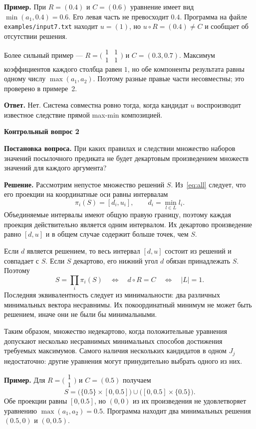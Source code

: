 \documentclass[14pt,a4paper]{extarticle}
\newcommand{\reportheading}[1]{\par\vspace{0.8\baselineskip}\noindent\textbf{#1}\par\nobreak\vspace{0.35\baselineskip}\nobreak}
\begin{document}
\textbf{Пример.} При $R=(0.4)$ и $C=(0.6)$ уравнение имеет вид $\min(a_1,0.4)=0.6$. Его левая часть не превосходит $0.4$. Программа на файле \texttt{examples/input7.txt} находит $u=(1)$, но $u\circ R=(0.4)\ne C$ и сообщает об отсутствии решения.

Более сильный пример --- $R=\bigl(\begin{smallmatrix}1&1\\1&1\end{smallmatrix}\bigr)$ и $C=(0.3,0.7)$. Максимум коэффициентов каждого столбца равен $1$, но обе компоненты результата равны одному числу $\max(a_1,a_2)$. Поэтому разные правые части несовместны; это проверено в примере~2.

\textbf{Ответ.} Нет. Система совместна ровно тогда, когда кандидат $u$ воспроизводит известное следствие прямой max-min композицией.

\clearpage
\reportheading{Контрольный вопрос 2}
\noindent\textbf{Постановка вопроса.} При каких правилах и следствии множество наборов значений посылочного предиката не будет декартовым произведением множеств значений для каждого аргумента?

\textbf{Решение.} Рассмотрим непустое множество решений $S$. Из~\eqref{eq:all} следует, что его проекции на координатные оси равны интервалам
\[
 \pi_i(S)=[d_i,u_i],\qquad d_i=\min_{l\in L}l_i.
\]
Объединяемые интервалы имеют общую правую границу, поэтому каждая проекция действительно является одним интервалом. Их декартово произведение равно $[d,u]$ и в общем случае содержит больше точек, чем $S$.

Если $d$ является решением, то весь интервал $[d,u]$ состоит из решений и совпадает с $S$. Если $S$ декартово, его нижний угол $d$ обязан принадлежать $S$. Поэтому
\begin{equation}
 S=\prod_i\pi_i(S)
 \quad\Longleftrightarrow\quad d\circ R=C
 \quad\Longleftrightarrow\quad |L|=1.
 \label{eq:cartesian}
\end{equation}
Последняя эквивалентность следует из минимальности: два различных минимальных вектора несравнимы. Их покоординатный минимум не может быть решением, иначе они не были бы минимальными.

Таким образом, множество недекартово, когда положительные уравнения допускают несколько несравнимых минимальных способов достижения требуемых максимумов. Самого наличия нескольких кандидатов в одном $J_j$ недостаточно: другие уравнения могут принудительно выбрать одного из них.

\textbf{Пример.} Для $R=\bigl(\begin{smallmatrix}1\\1\end{smallmatrix}\bigr)$ и $C=(0.5)$ получаем
\[
 S=\bigl(\{0.5\}\times[0,0.5]\bigr)
 \cup\bigl([0,0.5]\times\{0.5\}\bigr).
\]
Обе проекции равны $[0,0.5]$, но $(0,0)$ из их произведения не удовлетворяет уравнению $\max(a_1,a_2)=0.5$. Программа находит два минимальных решения $(0.5,0)$ и $(0,0.5)$.
\end{document}
